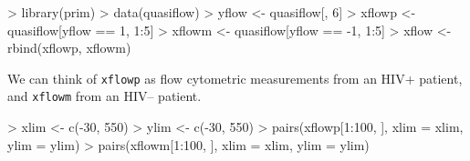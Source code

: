 \documentclass[a4paper,11pt]{article}
\begin{document}
\begin{Schunk}
\begin{Sinput}
> library(prim)
> data(quasiflow)
> yflow <- quasiflow[, 6]
> xflowp <- quasiflow[yflow == 1, 1:5]
> xflowm <- quasiflow[yflow == -1, 1:5]
> xflow <- rbind(xflowp, xflowm)
\end{Sinput}
\end{Schunk}
We can think of \texttt{xflowp} as flow cytometric measurements from an
HIV+ patient, and \texttt{xflowm} from an HIV-- patient.
\begin{Schunk}
\begin{Sinput}
> xlim <- c(-30, 550)
> ylim <- c(-30, 550)
> pairs(xflowp[1:100, ], xlim = xlim, ylim = ylim)
> pairs(xflowm[1:100, ], xlim = xlim, ylim = ylim)
\end{Sinput}
\end{Schunk}
\end{document}
